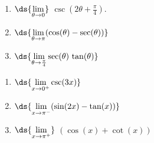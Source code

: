 \documentclass{ximera}
\begin{document}
\begin{multicols}{3}
\begin{enumerate}
\setcounter{enumi}{\value{HW}}

\item  $\ds{\lim_{\theta \rightarrow 0}}$ $\csc\left(2\theta + \frac{\pi}{4}\right)$.

\item $\ds{\lim_{\theta \rightarrow \pi} (\cos(\theta)  -  \sec(\theta))}$

\item $\ds{\lim_{\theta \rightarrow \frac{\pi}{4}} \sec(\theta) \, \tan(\theta)}$

\setcounter{HW}{\value{enumi}}
\end{enumerate}
\end{multicols}

\begin{multicols}{3}
\begin{enumerate}
\setcounter{enumi}{\value{HW}}

\item  $\ds{\lim_{x \rightarrow 0^{+}} \csc(3x)}$

\item $\ds{\lim_{x \rightarrow \pi^{-}}  (\sin(2x)  - \tan(x))}$

\item\label{othertriglimitexlast} $\ds{\lim_{x \rightarrow \pi^{+}}}$ $(\cos(x) + \cot(x))$

\setcounter{HW}{\value{enumi}}
\end{enumerate}
\end{multicols}
\end{document}

